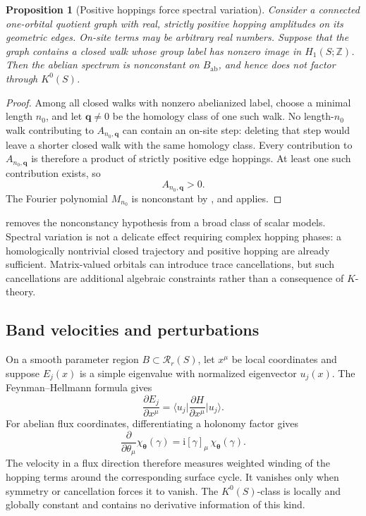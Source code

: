 \documentclass[11pt]{article}
\newtheorem{proposition}[theorem]{Proposition}
\theoremstyle{definition}
\theoremstyle{remark}
\newcommand{\ZZ}{\mathbb Z}
\newcommand{\cR}{\mathcal R}
\newcommand{\ii}{\mathrm i}
\newcommand{\ket}[1]{\lvert #1\rangle}
\newcommand{\bra}[1]{\langle #1\rvert}
\begin{document}
\begin{proposition}[Positive hoppings force spectral variation]
\label{prop:positive-hopping-variation}
Consider a connected one-orbital quotient graph with real, strictly positive
hopping amplitudes on its geometric edges.  On-site terms may be arbitrary
real numbers.  Suppose that the graph contains a closed walk whose group
label has nonzero image in \(H_1(S;\ZZ)\).  Then the abelian spectrum is
nonconstant on \(B_{\mathrm{ab}}\), and hence does not factor through
\(K^0(S)\).
\end{proposition}

\begin{proof}
Among all closed walks with nonzero abelianized label, choose a minimal
length \(n_0\), and let \(\bm q\neq0\) be the homology class of one such walk.
No length-\(n_0\) walk contributing to \(A_{n_0,\bm q}\) can contain an
on-site step: deleting that step would leave a shorter closed walk with the
same homology class.  Every contribution to \(A_{n_0,\bm q}\) is therefore a
product of strictly positive edge hoppings.  At least one such contribution
exists, so
\[
                         A_{n_0,\bm q}>0.
                         \tag{4.9a}\label{eq:positive-fourier-coefficient}
\]
The Fourier polynomial \(M_{n_0}\) is nonconstant by
, and  applies.
\end{proof}

 removes the nonconstancy hypothesis
from a broad class of scalar models.  Spectral variation is not a delicate
effect requiring complex hopping phases: a homologically nontrivial closed
trajectory and positive hopping are already sufficient.  Matrix-valued
orbitals can introduce trace cancellations, but such cancellations are
additional algebraic constraints rather than a consequence of \(K\)-theory.

\subsection{Band velocities and perturbations}

On a smooth parameter region \(B\subset\cR_r(S)\), let \(x^\mu\) be local
coordinates and suppose \(E_j(x)\) is a simple eigenvalue with normalized
eigenvector \(u_j(x)\).  The Feynman--Hellmann formula gives
\[
       \frac{\partial E_j}{\partial x^\mu}
          =\bra{u_j}\frac{\partial H}{\partial x^\mu}\ket{u_j}.
          \tag{4.10}\label{eq:feynman-hellmann}
\]
For abelian flux coordinates, differentiating a holonomy factor gives
\[
 \frac{\partial}{\partial\theta_\mu}\chi_{\bm\theta}(\gamma)
       =\ii[\gamma]_\mu\,\chi_{\bm\theta}(\gamma).
 \tag{4.11}\label{eq:holonomy-derivative}
\]
The velocity in a flux direction therefore measures weighted winding of the
hopping terms around the corresponding surface cycle.  It vanishes only when
symmetry or cancellation forces it to vanish.  The \(K^0(S)\)-class is locally
and globally constant and contains no derivative information of this kind.
\end{document}
